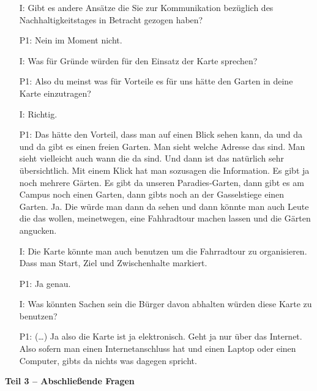 \begin{itemize}
	\item[I:] Gibt es andere Ans{\"a}tze die Sie zur Kommunikation bez{\"u}glich des Nachhaltigkeitstages in Betracht gezogen haben?
	\item[P1:] Nein im Moment nicht.
	\item[I:] Was f{\"u}r Gr{\"u}nde w{\"u}rden f{\"u}r den Einsatz der Karte sprechen? 
    \item[P1:] Also du meinst was f{\"u}r Vorteile es f{\"u}r uns h{\"a}tte den Garten in deine Karte einzutragen?
    \item[I:] Richtig.
	\item[P1:] Das h{\"a}tte den Vorteil, dass man auf einen Blick sehen kann, da und da und da gibt es einen freien Garten. Man sieht welche Adresse das sind. Man sieht vielleicht auch wann die da sind. Und dann ist das nat{\"u}rlich sehr {\"u}bersichtlich. Mit einem Klick hat man sozusagen die Information. Es gibt ja noch mehrere G{\"a}rten. Es gibt da unseren Paradies-Garten, dann gibt es am Campus noch einen Garten, dann gibts noch an der Gasselstiege einen Garten. Ja. Die w{\"u}rde man dann da sehen und dann k{\"o}nnte man auch Leute die das wollen, meinetwegen, eine Fahhradtour machen lassen und die G{\"a}rten angucken.
	\item[I:] Die Karte k{\"o}nnte man auch benutzen um die Fahrradtour zu organisieren. Dass man Start, Ziel und Zwischenhalte markiert. 
	\item[P1:] Ja genau.
	\item[I:] Was k{\"o}nnten Sachen sein die B{\"u}rger davon abhalten w{\"u}rden diese Karte zu benutzen?
	\item[P1:] (\dots) Ja also die Karte ist ja elektronisch. Geht ja nur {\"u}ber das Internet. Also sofern man einen Internetanschluss hat und einen Laptop oder einen Computer, gibts da nichts was dagegen spricht.
\end{itemize}
\textbf{Teil 3 -- Abschlie{\ss}ende Fragen}
